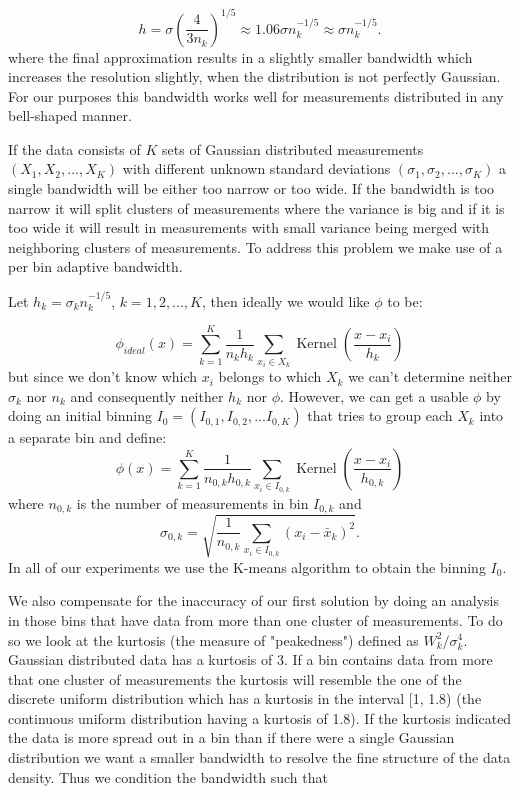 \[
	h = \sigma \left ( \frac{4}{3n_k} \right )^{1/5} \approx 1.06 \sigma n_k^{-1/5} \approx \sigma n_k^{-1/5}.
\]
where the final approximation results in a slightly smaller bandwidth which increases the resolution slightly, when the distribution is not perfectly Gaussian. For our purposes this bandwidth works well for measurements distributed in any bell-shaped manner.
\par
If the data consists of $K$ sets of Gaussian distributed measurements $(X_1, X_2, ..., X_K)$ with different unknown standard deviations $(\sigma_1, \sigma_2, ..., \sigma_K)$ a single bandwidth will be either too narrow or too wide. If the bandwidth is too narrow it will split clusters of measurements where the variance is big and if it is too wide it will result in measurements with small variance being merged with neighboring clusters of measurements. To address this problem we make use of a per bin adaptive bandwidth.
\par
Let $h_k=\sigma_k n_k^{-1/5}$, $k=1,2,...,K$, then ideally we would like $\phi$ to be:

\[
	\phi_{ideal}(x) = \sum_{k=1}^K \frac{1}{n_k h_k} \sum_{x_i \in X_k} \operatorname{Kernel} \left ( \frac{x - x_i}{h_k} \right )
\]
but since we don't know which $x_i$ belongs to which $X_k$ we can't determine neither $\sigma_k$ nor $n_k$ and consequently neither $h_k$ nor $\phi$. However, we can get a usable $\phi$ by doing an initial binning $I_0 = (I_{0,1}, I_{0,2}, ... I_{0,K})$ that tries to group each $X_k$ into a separate bin and define:
\begin{equation}
	\phi(x) = \sum_{k=1}^K \frac{1}{n_{0,k} h_{0,k}} \sum_{x_i \in I_{0,k}} \operatorname{Kernel} \left ( \frac{x - x_i}{h_{0,k}} \right )
\end{equation}
where $n_{0,k}$ is the number of measurements in bin $I_{0,k}$ and
\begin{equation}
	\sigma_{0,k} = \sqrt{\frac{1}{n_{0,k}} \sum_{x_i \in I_{0,k}}(x_i - \bar{x}_k)^2}. 
\end{equation}
 In all of our experiments we use the K-means algorithm to obtain the binning $I_0$.
\par
We also compensate for the inaccuracy of our first solution by doing an analysis in those bins that have data from more than one cluster of measurements. To do so we look at the kurtosis (the measure of "peakedness") defined as $W_k^2/\sigma_k^4$. Gaussian distributed data has a kurtosis of 3. If a bin contains data from more that one cluster of measurements the kurtosis will resemble the one of the discrete uniform distribution which has a kurtosis in the interval [1, 1.8) (the continuous uniform distribution having a kurtosis of 1.8). If the kurtosis indicated the data is more spread out in a bin than if there were a single Gaussian distribution we want a smaller bandwidth to resolve the fine structure of the data density. Thus we condition the bandwidth such that 

